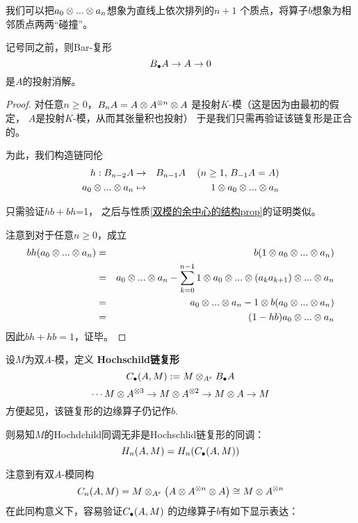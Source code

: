 我们可以把$a_0\otimes...\otimes a_n$想象为直线上依次排列的$n+1$
个质点，将算子$b$想象为相邻质点两两“碰撞”。

\begin{prop}记号同之前，则Bar-复形
$$B_{\bullet} A\to A\to 0$$
是$A$的投射消解。
\end{prop}

\begin{proof}
对任意$n\geq0$，$B_nA=A\otimes A^{\otimes n}\otimes A$
是投射$K$-模（这是因为由最初的假定，
$A$是投射$K$-模，从而其张量积也投射）
于是我们只需再验证该链复形是正合的。

为此，我们构造链同伦
\begin{eqnarray*}
h:B_{n-2}A&\to& B_{n-1}A
\,\,\,\,\,\,\,(n\geq1,\,B_{-1}A=A)\\
a_0\otimes...\otimes a_n
&\mapsto&
1\otimes a_0\otimes...\otimes a_n
\end{eqnarray*}

只需验证$hb+bh$=1，
之后与性质\ref{双模的余中心的结构prop}的证明类似。

注意到对于任意$n\geq 0$，成立
\begin{eqnarray*}
    bh(a_0\otimes...\otimes a_n)
&=& b(1\otimes a_0\otimes...\otimes a_n)\\
&=& a_0\otimes...\otimes a_n-
    \sum_{k=0}^{n-1}
        1\otimes a_0\otimes...\otimes(a_ka_{k+1})\otimes...\otimes a_n\\
&=& a_0\otimes...\otimes a_n-
    1\otimes b(a_0\otimes...\otimes a_n)\\
&=&(1-hb)a_0\otimes...\otimes a_n
\end{eqnarray*}
因此$bh+hb=1$，证毕。
\end{proof}

\begin{definition}
设$M$为双$A$-模，定义
\textbf{Hochschild链复形}
$$C_{\bullet}(A,M):=M\otimes_{A^e} B_{\bullet} A$$
$$\cdots M\otimes A^{\otimes 3}\to M\otimes A^{\otimes 2}\to M\otimes A\to M$$
方便起见，该链复形的边缘算子仍记作$b$.
\end{definition}

则易知$M$的Hochdchild同调无非是Hochschlid链复形的同调：
$$H_n(A,M)=H_n(C_{\bullet}(A,M))$$

注意到有双$A$-模同构
$$C_n(A,M)=M\otimes_{A^e}
\left(A\otimes A^{\otimes n}\otimes A\right)
\cong M\otimes A^{\otimes n}$$
在此同构意义下，容易验证$C_{\bullet}(A,M)$
的边缘算子$b$有如下显示表达：

